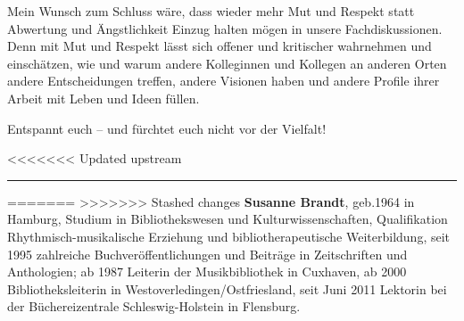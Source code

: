 \documentclass[a4paper,
fontsize=11pt,
oneside,
numbers=noperiodatend,
parskip=half-,
bibliography=totoc,
final
]{scrartcl}
\begin{document}
Mein Wunsch zum Schluss wäre, dass wieder mehr Mut und Respekt statt
Abwertung und Ängstlichkeit Einzug halten mögen in unsere
Fachdiskussionen. Denn mit Mut und Respekt lässt sich offener und
kritischer wahrnehmen und einschätzen, wie und warum andere Kolleginnen
und Kollegen an anderen Orten andere Entscheidungen treffen, andere
Visionen haben und andere Profile ihrer Arbeit mit Leben und Ideen
füllen.

Entspannt euch -- und fürchtet euch nicht vor der Vielfalt!

<<<<<<< Updated upstream
\begin{center}\rule{0.5\linewidth}{\linethickness}\end{center}

=======
>>>>>>> Stashed changes
\textbf{Susanne Brandt}, geb.1964 in Hamburg, Studium in
Bibliothekswesen und Kulturwissenschaften, Qualifikation
Rhythmisch-musikalische Erziehung und bibliotherapeutische
Weiterbildung, seit 1995 zahlreiche Buchveröffentlichungen und Beiträge
in Zeitschriften und Anthologien; ab 1987 Leiterin der Musikbibliothek
in Cuxhaven, ab 2000 Bibliotheksleiterin in
Westoverledingen/Ostfriesland, seit Juni 2011 Lektorin bei der
Büchereizentrale Schleswig-Holstein in Flensburg.
\end{document}
